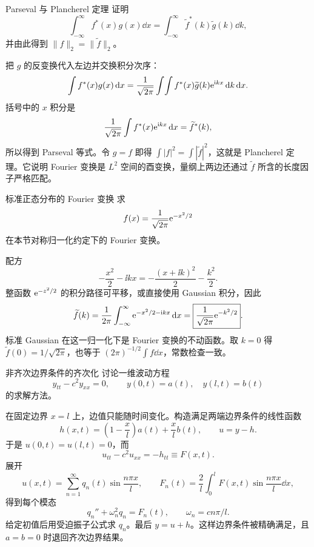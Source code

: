 \begin{advexamplebox}{Parseval 与 Plancherel 定理}\label{advA3:ex:parseval-plancherel}
证明
\[
 \int_{-\infty}^{\infty}f^*(x)g(x)\dd x
 =\int_{-\infty}^{\infty}\widetilde f^*(k)\widetilde g(k)\dd k,
\]
并由此得到 $\|f\|_2=\|\widetilde f\|_2$。

\AQParseval
\end{advexamplebox}
\begin{advsolution}
\AAParseval

把 $g$ 的反变换代入左边并交换积分次序：
\[
 \int f^*(x)g(x)\mathop{}\!\mathrm d x
 =\frac1{\sqrt{2\pi}}\int\!\int
 f^*(x)\widetilde g(k)\mathrm e^{\mathrm i kx}\mathop{}\!\mathrm d k\mathop{}\!\mathrm d x.
\]
括号中的 $x$ 积分是
\[
 \frac1{\sqrt{2\pi}}\int f^*(x)\mathrm e^{\mathrm i kx}\mathop{}\!\mathrm d x
 =\widetilde f^*(k),
\]
所以得到 Parseval 等式。令 $g=f$ 即得
$\int|f|^2=\int|\widetilde f|^2$，这就是 Plancherel 定理。它说明 Fourier 变换是 $L^2$ 空间的酉变换，量纲上两边还通过 $\widetilde f$ 所含的长度因子严格匹配。
\end{advsolution}

\begin{advexamplebox}{标准正态分布的 Fourier 变换}\label{advA3:ex:gaussian-fourier}
求
\[
 f(x)=\frac1{\sqrt{2\pi}}\mathrm e^{-x^2/2}
\]
在本节对称归一化约定下的 Fourier 变换。

\AQGaussianFourier
\end{advexamplebox}
\begin{advsolution}
\AAGaussianFourier

配方
\[
 -\frac{x^2}{2}-\ii kx=-\frac{(x+\ii k)^2}{2}-\frac{k^2}{2}.
\]
整函数 $\mathrm e^{-z^2/2}$ 的积分路径可平移，或直接使用 Gaussian 积分，因此
\[
 \widetilde f(k)=\frac1{2\pi}\int_{-\infty}^{\infty}
 \mathrm e^{-x^2/2-\mathrm i kx}\mathop{}\!\mathrm d x
 =\boxed{\frac1{\sqrt{2\pi}}\mathrm e^{-k^2/2}}.
\]
标准 Gaussian 在这一归一化下是 Fourier 变换的不动函数。取 $k=0$ 得
$\widetilde f(0)=1/\sqrt{2\pi}$，也等于 $(2\pi)^{-1/2}\int f\dd x$，常数检查一致。
\end{advsolution}

\begin{advexamplebox}{非齐次边界条件的齐次化}\label{advA3:ex:inhomogeneous-boundary}
讨论一维波动方程
\[
 y_{tt}-c^2y_{xx}=0,\qquad y(0,t)=a(t),\quad y(l,t)=b(t)
\]
的求解方法。

\AQBoundaryLift
\end{advexamplebox}
\begin{advsolution}
\AABoundaryLift

在固定边界 $x=l$ 上，边值只能随时间变化。构造满足两端边界条件的线性函数
\[
 h(x,t)=\left(1-\frac xl\right)a(t)+\frac xl b(t),
\qquad u=y-h.
\]
于是 $u(0,t)=u(l,t)=0$，而
\[
 u_{tt}-c^2u_{xx}=-h_{tt}\equiv F(x,t).
\]
展开
\[
 u(x,t)=\sum_{n=1}^\infty q_n(t)\sin\frac{n\pi x}{l},\qquad
 F_n(t)=\frac2l\int_0^lF(x,t)\sin\frac{n\pi x}{l}\dd x,
\]
得到每个模态
\[
 q_n''+\omega_n^2q_n=F_n(t),\qquad \omega_n=cn\pi/l.
\]
给定初值后用受迫振子公式求 $q_n$。最后 $y=u+h$。这样边界条件被精确满足，且 $a=b=0$ 时退回齐次边界结果。
\end{advsolution}

